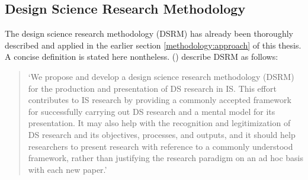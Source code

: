 %
%
%
%
%
%













\subsection{Design Science Research Methodology}

The
design science research methodology (DSRM)
has already been thoroughly described and applied in the earlier section
\ref{methodology:approach} 
of this thesis.
A concise definition is stated here nontheless.
\citeauthor{designScienceResearchMethodologyForInformationSystemsResearch} (\citeyear{designScienceResearchMethodologyForInformationSystemsResearch})
describe DSRM as follows:

\begin{quotation}
\noindent
\enquote*{We propose and develop a design science research methodology (DSRM) for the
production and presentation of DS research in IS. This effort contributes to IS research
by providing a commonly accepted framework for successfully carrying out DS research
and a mental model for its presentation. It may also help with the recognition
and legitimization of DS research and its objectives, processes, and outputs, and it
should help researchers to present research with reference to a commonly understood
framework, rather than justifying the research paradigm on an ad hoc basis with each
new paper.}
\autocite{designScienceResearchMethodologyForInformationSystemsResearch}
\end{quotation}


